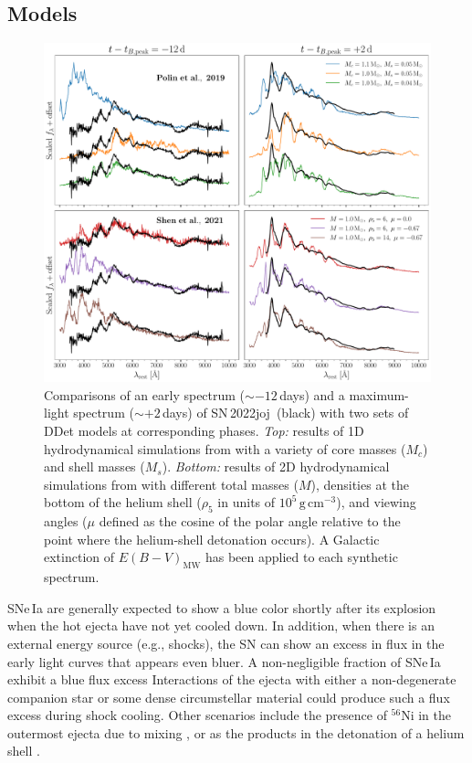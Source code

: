 \documentclass[twocolumn]{aastex631}
\newcommand{\sn}{SN\,2022joj}
\begin{document}
\begin{CJK*}{UTF8}{gbsn}
\subsection{Models} \label{sec:model}
\begin{figure}
    \centering
    \includegraphics[width=\linewidth]{model_comparison_spec.pdf}
    \caption{Comparisons of an early spectrum ($\sim$$-12$\,days) and a maximum-light spectrum ($\sim$$+2$\,days) of \sn\ (black) with two sets of DDet models at corresponding phases. \textit{Top:} results of 1D hydrodynamical simulations from \citet{polin_observational_2019} with a variety of core masses ($M_c$) and shell masses ($M_s$). \textit{Bottom:} results of 2D hydrodynamical simulations from \citep{Shen_2D_2021} with different total masses ($M$), densities at the bottom of the helium shell ($\rho_5$ in units of $10^{5}\,\mathrm{g\,cm^{-3}}$), and viewing angles ($\mu$ defined as the cosine of the polar angle relative to the point where the helium-shell detonation occurs). A Galactic extinction of $E(B-V)_\mathrm{MW}$ has been applied to each synthetic spectrum.}
    \label{fig:model_spec}
\end{figure}
SNe\,Ia are generally expected to show a blue color shortly after its explosion when the hot ejecta have not yet cooled down. In addition, when there is an external energy source (e.g., shocks), the SN can show an excess in flux in the early light curves that appears even bluer. A non-negligible fraction of SNe\,Ia exhibit a blue flux excess \citep{Deckers_2022} Interactions of the ejecta with either a non-degenerate companion star \citep{Cao_14atg_2015,Marion_12cg_2016,Hosseinzadeh_17cbv_2017} or some dense circumstellar material \citep{Jiang_20hvf_2021,Dimitriadis_21zny_2023} could produce such a flux excess during shock cooling. Other scenarios include the presence of $^{56}$Ni in the outermost ejecta due to mixing \citep{Piro_2013,Magee_2020}, or as the products in the detonation of a helium shell \citep{polin_observational_2019}. 


\end{CJK*}
\end{document}
